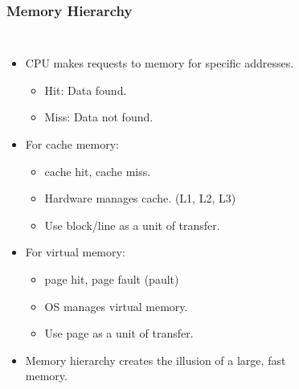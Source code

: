 \begin{frame}
    \frametitle{Memory Hierarchy}
    \begin{columns}
        \begin{itemize}
            \item CPU makes requests to memory for specific addresses.
            \begin{itemize}
                \item Hit: Data found.
                \item Miss: Data not found.
            \end{itemize}
            \item For cache memory:
            \begin{itemize}
                \item cache hit, cache miss.
                \item Hardware manages cache. (L1, L2, L3)
                \item Use block/line as a unit of transfer.
            \end{itemize}
            \item For virtual memory:
            \begin{itemize}
                \item page hit, page fault (pault)
                \item OS manages virtual memory.
                \item Use page as a unit of transfer.
            \end{itemize}
            \item Memory hierarchy creates the illusion of a large, fast memory.
        \end{itemize}

        \newsavebox{\asciimemheir}
        \begin{lrbox}{\asciimemheir}
            \begin{varwidth}{\maxdimen}
            \end{varwidth}
        \end{lrbox}%

        \begin{figure}[h]
            \centering
            \scalebox{0.7}{\usebox{\asciimemheir}}
        \end{figure}

    \end{columns}
\end{frame}

